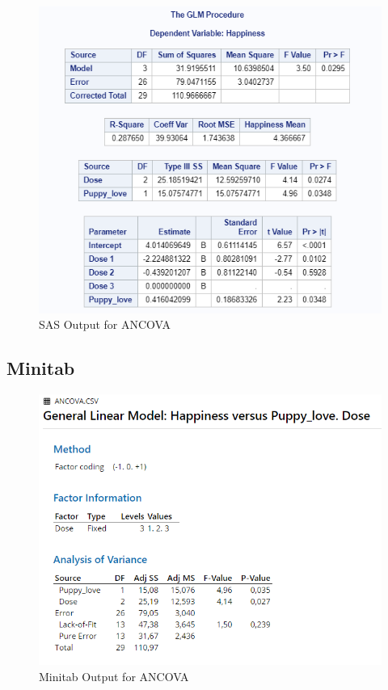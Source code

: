 \documentclass[
]{book}
\begin{document}
\begin{figure}[!h]
\includegraphics{Screenshots/ANCOVA/ancovaSAS} \caption{\label{fig:ancovaSAS}SAS Output for ANCOVA}\label{fig:ancovaSAS}
\end{figure}

\hypertarget{minitab-5}{%
\subsection{Minitab}\label{minitab-5}}

\begin{figure}[!h]
\includegraphics{Screenshots/ANCOVA/ancovaMinitab} \caption{\label{fig:ancovaMinitab}Minitab Output for ANCOVA}\label{fig:ancovaMinitab}
\end{figure}
\end{document}
